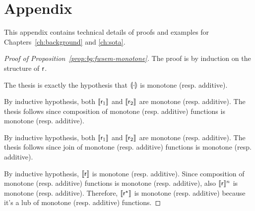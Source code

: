 
\chapter{Appendix}
This appendix contains technical details of proofs and examples for Chapters~\ref{ch:background} and \ref{ch:sota}.

\begin{proof}[Proof of Proposition~\ref{prop:bg:fwsem-monotone}]
	The proof is by induction on the structure of $\mathsf{r}$.

	\proofcase{$\expe$}
	The thesis is exactly the hypothesis that $\llparenthesis\cdot\rrparenthesis$ is monotone (resp. additive).

	By inductive hypothesis, both $\llbracket\mathsf{r}_1\rrbracket$ and $\llbracket\mathsf{r}_2\rrbracket$ are monotone (resp. additive). The thesis follows since composition of monotone (resp. additive) functions is monotone (resp. additive).

	By inductive hypothesis, both $\llbracket\mathsf{r}_1\rrbracket$ and $\llbracket\mathsf{r}_2\rrbracket$ are monotone (resp. additive). The thesis follows since join of monotone (resp. additive) functions is monotone (resp. additive).

	\proofcase{$\regr^{\kstar}$}
	By inductive hypothesis, $\llbracket\mathsf{r}\rrbracket$ is monotone (resp. additive). Since composition of monotone (resp. additive) functions is monotone (resp. additive), also $\llbracket\mathsf{r}\rrbracket^n$ is monotone (resp. additive). Therefore, $\llbracket\mathsf{r}^{\star}\rrbracket$ is monotone (resp. additive) because it's a lub of monotone (resp. additive) functions.
\end{proof}
